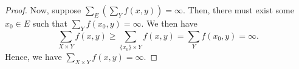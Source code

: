 \documentclass[11pt]{article} %
\theoremstyle{plain}
\begin{document}
\begin{proof}
Now, suppose $\sum_E \left(\sum_Y f(x,y)\right) = \infty$. Then, there must exist some $x_0\in E$ such that $\sum_Y f(x_0,y) = \infty$. We then have
\[\sum_{X\times Y}f(x,y) \geq \sum_{\{x_0\}\times Y} f(x,y) = \sum_Y f(x_0,y) = \infty.\]
Hence, we have $\sum_{X\times Y}f(x,y) = \infty$.
\end{proof}
\end{document}
